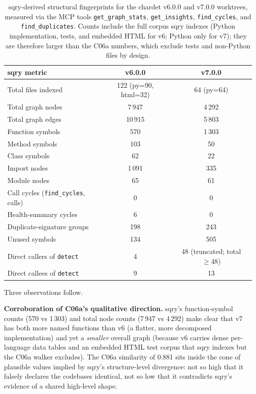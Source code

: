 \documentclass[11pt,letterpaper]{article}
\begin{document}
\begin{table}[h]
\small
\centering
\caption{sqry-derived structural fingerprints for the chardet v6.0.0
and v7.0.0 worktrees, measured via the MCP tools
\texttt{get\_graph\_stats}, \texttt{get\_insights},
\texttt{find\_cycles}, and \texttt{find\_duplicates}. Counts include
the full corpus sqry indexes (Python implementation, tests, and
embedded HTML for v6; Python only for v7); they are therefore
larger than the C06a numbers, which exclude tests and non-Python
files by design.}
\label{tab:sqry}
\begin{tabular}{lcc}
\toprule
sqry metric & v6.0.0 & v7.0.0 \\
\midrule
Total files indexed              & 122 (py=90, html=32) & 64 (py=64) \\
Total graph nodes                & 7\,947 & 4\,292 \\
Total graph edges                & 10\,915 & 5\,803 \\
Function symbols                 & 570 & 1\,303 \\
Method symbols                   & 103 & 50 \\
Class symbols                    & 62 & 22 \\
Import nodes                     & 1\,091 & 335 \\
Module nodes                     & 65 & 61 \\
Call cycles (\texttt{find\_cycles}, calls) & 0 & 0 \\
Health-summary cycles            & 6 & 0 \\
Duplicate-signature groups       & 198 & 243 \\
Unused symbols                   & 134 & 505 \\
Direct callers of \texttt{detect} & 4 & 48 (truncated; total $\ge48$) \\
Direct callees of \texttt{detect} & 9 & 13 \\
\bottomrule
\end{tabular}
\end{table}

Three observations follow.

\textbf{Corroboration of C06a's qualitative direction.} sqry's
function-symbol counts (570 vs 1\,303) and total node counts
(7\,947 vs 4\,292) make clear that v7 has both more named functions
than v6 (a flatter, more decomposed implementation) and yet a
\emph{smaller} overall graph (because v6 carries dense per-language
data tables and an embedded HTML test corpus that sqry indexes but
the C06a walker excludes). The C06a similarity of 0.881 sits inside
the cone of plausible values implied by sqry's structure-level
divergence: not so high that it falsely declares the codebases
identical, not so low that it contradicts sqry's evidence of a
shared high-level shape.
\end{document}
